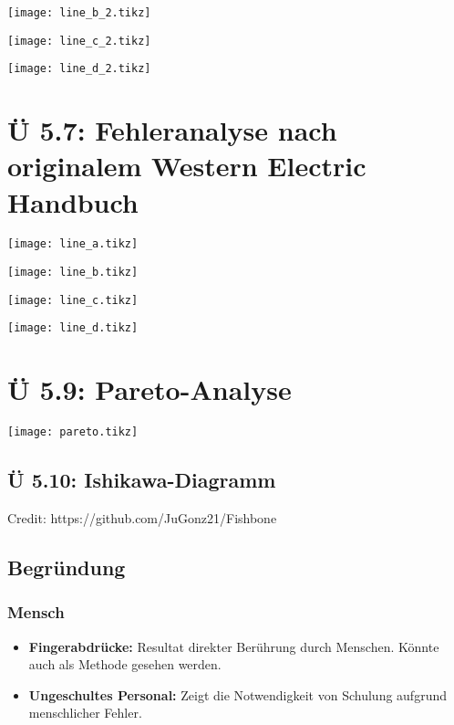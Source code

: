 \documentclass[12pt]{article}
\begin{document}
\texttt{[image: line\_b\_2.tikz]}

\texttt{[image: line\_c\_2.tikz]}

\texttt{[image: line\_d\_2.tikz]}

\section{Ü 5.7: Fehleranalyse nach originalem Western Electric Handbuch}

\texttt{[image: line\_a.tikz]}

\texttt{[image: line\_b.tikz]}

\texttt{[image: line\_c.tikz]}

\texttt{[image: line\_d.tikz]}



\section{Ü 5.9: Pareto-Analyse}

\texttt{[image: pareto.tikz]}

\begin{landscape}
	\section{Ü 5.10: Ishikawa-Diagramm}

	Credit: https://github.com/JuGonz21/Fishbone

	\begin{center}
		\resizebox{\linewidth}{!}{%
			
		}
	\end{center}
\end{landscape}

\subsection{Begründung}

\subsubsection*{Mensch}
\begin{itemize}
	\item \textbf{Fingerabdrücke:} Resultat direkter Berührung durch Menschen. Könnte auch als Methode gesehen werden.
	\item \textbf{Ungeschultes Personal:} Zeigt die Notwendigkeit von Schulung aufgrund menschlicher Fehler.
\end{itemize}
\end{document}

